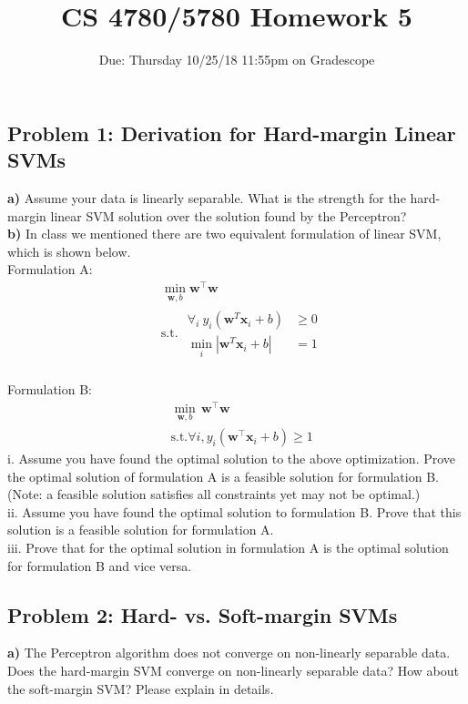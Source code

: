 \documentclass[a4paper]{article}
\title{CS 4780/5780 Homework 5\vspace{-10pt}}
\author{Due: Thursday 10/25/18 11:55pm on Gradescope}
\date{\vspace{-15pt}}
\begin{document}
\maketitle

\subsection*{Problem 1: Derivation for Hard-margin Linear SVMs}
\textbf{a)} Assume your data is linearly separable. What is the strength for the hard-margin linear SVM solution over the solution found by the Perceptron?\\

\textbf{b)} In class we mentioned there are two equivalent formulation of linear SVM, which is shown below.\\ Formulation A: 
\begin{align*} &\min_{\mathbf{w},b} \mathbf{w}^\top\mathbf{w}  \\ &\textrm{s.t. } \begin{matrix} \forall_i \ y_{i}(\mathbf{w}^T \mathbf{x}_{i}+b)&\geq 0\\ \min_{i}\left | \mathbf{w}^T \mathbf{x}_{i}+b \right | &= 1 \end{matrix} \end{align*}
\\ Formulation B:\\
\begin{align*}
&\min_{\mathbf{w},b} \,\mathbf{w}^\top\mathbf{w}\\
& \textrm {s.t.} \forall i, y_i(\mathbf{w}^\top \mathbf{x}_i+b)\geq 1
\end{align*}
i. Assume you have found the optimal solution to the above optimization. Prove the optimal solution of formulation A is a feasible solution for formulation B. \\(Note: a feasible solution satisfies all constraints yet may not be optimal.)\\
ii. Assume you have found the optimal solution to formulation B. Prove that this solution is a feasible solution for formulation A.\\
iii. Prove that for the optimal solution in formulation A is the optimal solution for formulation B and vice versa.


\subsection*{Problem 2: Hard- vs. Soft-margin SVMs}
\textbf{a)} The Perceptron algorithm does not converge on non-linearly separable data. Does the hard-margin SVM converge on non-linearly separable data? How about the soft-margin SVM? Please explain in details.\\
\end{document}
